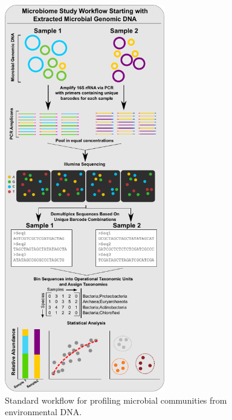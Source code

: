 \begin{figure}[tbh]
\centering
\includegraphics[width=2.75in]{Figures/intro_fig2}
\caption[Figure 1.2]{Standard workflow for profiling microbial communities from environmental DNA.}
\label{Figure 1.2}
\end{figure}

